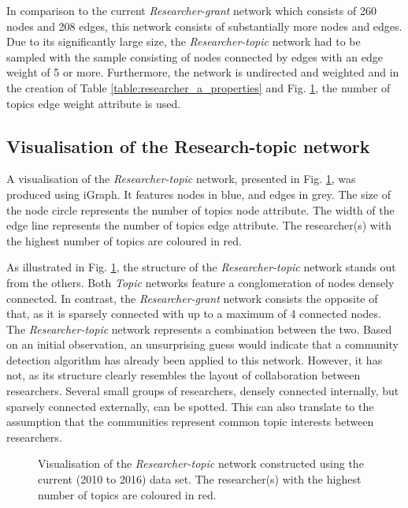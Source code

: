 In comparison to the current \textit{Researcher-grant} network which consists of 260 nodes and 208 edges, this network consists of substantially more nodes and edges. Due to its significantly large size, the \textit{Researcher-topic} network had to be sampled with the sample consisting of nodes connected by edges with an edge weight of 5 or more. Furthermore, the network is undirected and weighted and in the creation of Table \ref{table:researcher_a_properties} and Fig. \ref{figure:researcher_a_vis}, the number of topics edge weight attribute is used.

\subsection{Visualisation of the Research-topic network}

A visualisation of the \textit{Researcher-topic} network, presented in Fig. \ref{figure:researcher_a_vis}, was produced using iGraph. It features nodes in blue, and edges in grey. The size of the node circle represents the number of topics node attribute. The width of the edge line represents the number of topics edge attribute. The researcher(s) with the highest number of topics are coloured in red.

As illustrated in Fig. \ref{figure:researcher_a_vis}, the structure of the \textit{Researcher-topic} network stands out from the others. Both \textit{Topic} networks feature a conglomeration of nodes densely connected. In contrast, the \textit{Researcher-grant} network consists the opposite of that, as it is sparsely connected with up to a maximum of 4 connected nodes. The \textit{Researcher-topic} network represents a combination between the two. Based on an initial observation, an unsurprising guess would indicate that a community detection algorithm has already been applied to this network. However, it has not, as its structure clearly resembles the layout of collaboration between researchers. Several small groups of researchers, densely connected internally, but sparsely connected externally, can be spotted. This can also translate to the assumption that the communities represent common topic interests between researchers.

\begin{figure}[htpb]
    \centering
    \caption[Visualisation of the \textit{Researcher-topic} network constructed using the current (2010 to 2016) data set]{Visualisation of the \textit{Researcher-topic} network constructed using the current (2010 to 2016) data set. The researcher(s) with the highest number of topics are coloured in red.}
    \label{figure:researcher_a_vis}
\end{figure}